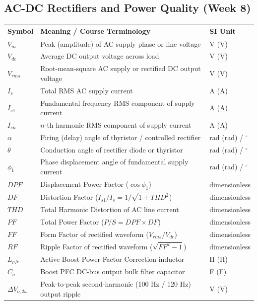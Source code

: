 \subsection{AC-DC Rectifiers and Power Quality (Week 8)}
\begin{center}
\begin{tabular}{@{}lll@{}}
\toprule
\textbf{Symbol} & \textbf{Meaning / Course Terminology} & \textbf{SI Unit} \\
\midrule
$V_m$ & Peak (amplitude) of AC supply phase or line voltage & \si{\volt} (V) \\
$V_{dc}$ & Average DC output voltage across load & \si{\volt} (V) \\
$V_{rms}$ & Root-mean-square AC supply or rectified DC output voltage & \si{\volt} (V) \\
$I_s$ & Total RMS AC supply current & \si{\ampere} (A) \\
$I_{s1}$ & Fundamental frequency RMS component of supply current & \si{\ampere} (A) \\
$I_{sn}$ & $n$-th harmonic RMS component of supply current & \si{\ampere} (A) \\
$\alpha$ & Firing (delay) angle of thyristor / controlled rectifier & \si{\radian} (rad) / $^\circ$ \\
$\theta$ & Conduction angle of rectifier diode or thyristor & \si{\radian} (rad) / $^\circ$ \\
$\phi_1$ & Phase displacement angle of fundamental supply current & \si{\radian} (rad) / $^\circ$ \\
$DPF$ & Displacement Power Factor ($\cos\phi_1$) & dimensionless \\
$DF$ & Distortion Factor ($I_{s1}/I_s = 1/\sqrt{1 + THD^2}$) & dimensionless \\
$THD$ & Total Harmonic Distortion of AC line current & dimensionless \\
$PF$ & Total Power Factor ($P/S = DPF \times DF$) & dimensionless \\
$FF$ & Form Factor of rectified waveform ($V_{rms}/V_{dc}$) & dimensionless \\
$RF$ & Ripple Factor of rectified waveform ($\sqrt{FF^2 - 1}$) & dimensionless \\
$L_{pfc}$ & Active Boost Power Factor Correction inductor & \si{\henry} (H) \\
$C_o$ & Boost PFC DC-bus output bulk filter capacitor & \si{\farad} (F) \\
$\Delta V_{o,2\omega}$ & Peak-to-peak second-harmonic (100 Hz / 120 Hz) output ripple & \si{\volt} (V) \\

\end{tabular}
\end{center}
